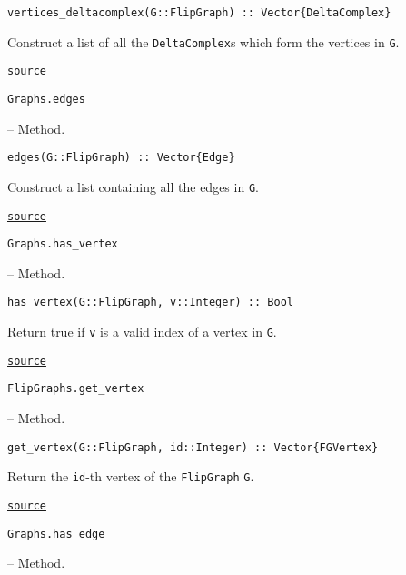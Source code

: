 \begin{adjustwidth}{2em}{0pt}


\begin{verbatim}
vertices_deltacomplex(G::FlipGraph) :: Vector{DeltaComplex}
\end{verbatim}

Construct a list of all the \texttt{DeltaComplex}s which form the vertices in \texttt{G}.



\href{https://github.com/schto223/FlipGraphs.jl/blob/490c01a7adf74b42f27dda05099165c47ae8133e/src/flipGraph.jl#L249-L253}{\texttt{source}}


\end{adjustwidth}
\hypertarget{13528482185720073226}{\texttt{Graphs.edges}}  -- {Method.}

\begin{adjustwidth}{2em}{0pt}


\begin{verbatim}
edges(G::FlipGraph) :: Vector{Edge}
\end{verbatim}

Construct a list containing all the edges in \texttt{G}.



\href{https://github.com/schto223/FlipGraphs.jl/blob/490c01a7adf74b42f27dda05099165c47ae8133e/src/flipGraph.jl#L173-L177}{\texttt{source}}


\end{adjustwidth}
\hypertarget{10831218003372438250}{\texttt{Graphs.has\_vertex}}  -- {Method.}

\begin{adjustwidth}{2em}{0pt}


\begin{verbatim}
has_vertex(G::FlipGraph, v::Integer) :: Bool
\end{verbatim}

Return true if \texttt{v} is a valid index of a vertex in \texttt{G}.



\href{https://github.com/schto223/FlipGraphs.jl/blob/490c01a7adf74b42f27dda05099165c47ae8133e/src/flipGraph.jl#L205-L209}{\texttt{source}}


\end{adjustwidth}
\hypertarget{12246764547045339836}{\texttt{FlipGraphs.get\_vertex}}  -- {Method.}

\begin{adjustwidth}{2em}{0pt}


\begin{verbatim}
get_vertex(G::FlipGraph, id::Integer) :: Vector{FGVertex}
\end{verbatim}

Return the \texttt{id}-th vertex of the \texttt{FlipGraph} \texttt{G}.



\href{https://github.com/schto223/FlipGraphs.jl/blob/490c01a7adf74b42f27dda05099165c47ae8133e/src/flipGraph.jl#L242-L246}{\texttt{source}}


\end{adjustwidth}
\hypertarget{4723161772743408612}{\texttt{Graphs.has\_edge}}  -- {Method.}

